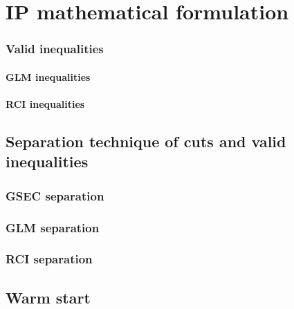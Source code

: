 \chapter{IP mathematical formulation}

\subsection{Valid inequalities}

\subsubsection{GLM inequalities}

\subsubsection{RCI inequalities}


\section{Separation technique of cuts and valid inequalities}

\subsection{GSEC separation}

\subsection{GLM separation}

\subsection{RCI separation}

\section{Warm start}
